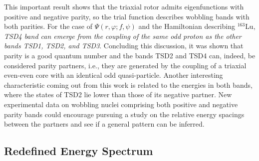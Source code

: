 This important result shows that the triaxial rotor admits eigenfunctions with positive and negative parity, so the trial function describes wobbling bands with both parities. For the case of $\Psi(r,\varphi;f,\psi)$ and the Hamiltonian describing $^{163}$Lu, \emph{TSD4 band can emerge from the coupling of the same odd proton as the other bands TSD1, TSD2, and TSD3}. Concluding this discussion, it was shown that parity is a good quantum number and the bands TSD2 and TSD4 can, indeed, be considered parity partners, i.e., they are generated by the coupling of a triaxial even-even core with an identical odd quasi-particle. Another interesting characteristic coming out from this work is related to the energies in both bands, where the states of TSD2 lie lower than those of its negative partner. New experimental data on wobbling nuclei comprising both positive and negative parity bands could encourage pursuing a study on the relative energy spacings between the partners and see if a general pattern can be inferred.

\subsection{Redefined Energy Spectrum}

